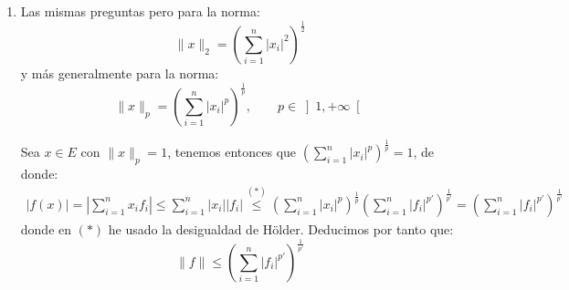 \begin{ejercicio}
\begin{enumerate}[label=\alph*)]
        \item Las mismas preguntas pero para la norma:
            \begin{equation*}
                \|x\|_2 = {\left(\sum_{i=1}^{n}|x_i|^2\right)}^{\frac{1}{2}}
            \end{equation*}
            y más generalmente para la norma:
            \begin{equation*}
                \|x\|_p = {\left(\sum_{i=1}^{n}|x_i|^p\right)}^{\frac{1}{p}}, \qquad p\in \left]1,+\infty\right[
            \end{equation*}

            \noindent
            Sea $x\in E$ con $\|x\|_p = 1$, tenemos entonces que ${\left(\sum_{i=1}^{n}|x_i|^p\right)}^{\frac{1}{p}}=1$, de donde:
            \begin{align*}
                |f(x)| = \left|\sum_{i=1}^{n}x_if_i\right| \leq \sum_{i=1}^{n}|x_i||f_i| \stackrel{(\ast)}{\leq} {\left(\sum_{i=1}^{n}|x_i|^p\right)}^{\frac{1}{p}}{\left(\sum_{i=1}^{n}|f_i|^{p'}\right)}^{\frac{1}{p'}} = {\left(\sum_{i=1}^{n}|f_i|^{p'}\right)}^{\frac{1}{p'}}
            \end{align*}
            donde en $(\ast)$ he usado la desigualdad de Hölder. Deducimos por tanto que:
            \begin{equation*}
                \|f\| \leq {\left(\sum_{i=1}^{n}|f_i|^{p'}\right)}^{\frac{1}{p'}}
            \end{equation*}
    \end{enumerate}
\end{ejercicio}

